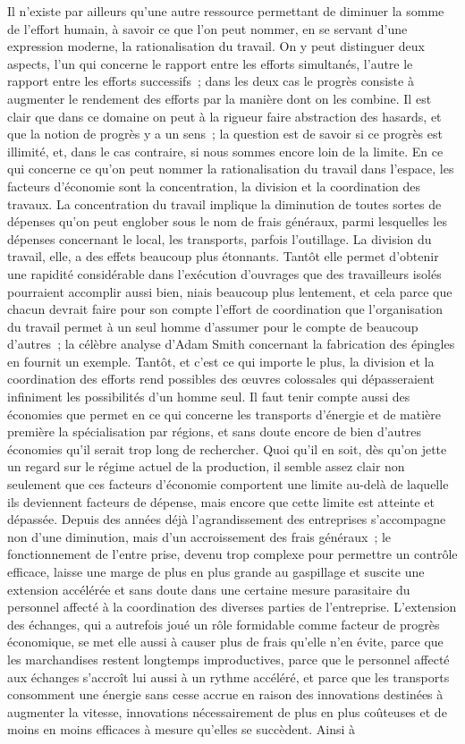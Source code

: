 \documentclass[french,twoside]{book} %
\begin{document}
Il n'existe par ailleurs qu'une autre ressource permettant de diminuer la somme de l'effort humain, à savoir ce que l'on peut nommer, en se servant d'une expression moderne, la rationalisation du travail. On y peut distinguer deux aspects, l'un qui concerne le rapport entre les efforts simultanés, l'autre le rapport entre les efforts successifs ; dans les deux cas le progrès consiste à augmenter le rendement des efforts par la manière dont on les combine. Il est clair que dans ce domaine on peut à la rigueur faire abstraction des hasards, et que la notion de progrès y a un sens ; la question est de savoir si ce progrès est illimité, et, dans le cas contraire, si nous sommes encore loin de la limite. En ce qui concerne ce qu'on peut nommer la rationalisation du travail dans l'espace, les facteurs d'économie sont la concentration, la division et la coordination des travaux. La concentration du travail implique la diminution de toutes sortes de dépenses qu'on peut englober sous le nom de frais généraux, parmi lesquelles les dépenses concernant le local, les transports, parfois l'outillage. La division du travail, elle, a des effets beaucoup plus étonnants. Tantôt elle permet d'obtenir une rapidité considérable dans l'exécution d'ouvrages que des travailleurs isolés pourraient accomplir aussi bien, niais beaucoup plus lentement, et cela parce que chacun devrait faire pour son compte l'effort de coordination que l'organisation du travail permet à un seul homme d'assumer pour le compte de beaucoup d'autres ; la célèbre analyse d'Adam Smith concernant la fabrication des épingles en fournit un exemple. Tantôt, et c'est ce qui importe le plus, la division et la coordination des efforts rend possibles des œuvres colossales qui dépasseraient infiniment les possibilités d'un homme seul. Il faut tenir compte aussi des économies que permet en ce qui concerne les transports d'énergie et de matière première la spécialisation par régions, et sans doute encore de bien d'autres économies qu'il serait trop long de rechercher. Quoi qu'il en soit, dès qu'on jette un regard sur le régime actuel de la production, il semble assez clair non seulement que ces facteurs d'économie comportent une limite au-delà de laquelle ils deviennent facteurs de dépense, mais encore que cette limite est atteinte et dépassée. Depuis des années déjà l'agrandissement des entreprises s'accompagne non d'une diminution, mais d'un accroissement des frais généraux ; le fonctionnement de l'entre prise, devenu trop complexe pour permettre un contrôle efficace, laisse une marge de plus en plus grande au gaspillage et suscite une extension accélérée et sans doute dans une certaine mesure parasitaire du personnel affecté à la coordination des diverses parties de l'entreprise. L'extension des échanges, qui a autrefois joué un rôle formidable comme facteur de progrès économique, se met elle aussi à causer plus de frais qu'elle n'en évite, parce que les marchandises restent longtemps improductives, parce que le personnel affecté aux échanges s'accroît lui aussi à un rythme accéléré, et parce que les transports consomment une énergie sans cesse accrue en raison des innovations destinées à augmenter la vitesse, innovations nécessairement de plus en plus coûteuses et de moins en moins efficaces à mesure qu'elles se succèdent. Ainsi à 
\end{document}
